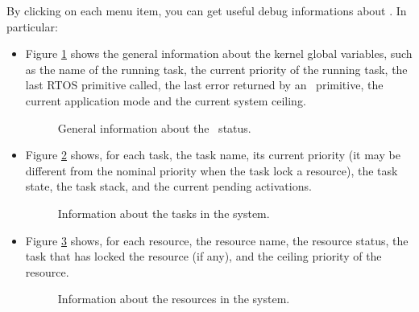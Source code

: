 By clicking on each menu item, you can get useful debug informations
about \ee. In particular:
\begin{itemize}
\item Figure \ref{fig:trace32_os} shows the general information about
  the kernel global variables, such as the name of the running task,
  the current priority of the running task, the last RTOS primitive
  called, the last error returned by an \ee\ primitive, the current
  application mode and the current system ceiling.
%
\begin{figure}
\caption{\label{fig:trace32_os} General information about the \ee\ status.}
\end{figure}
%

\item Figure \ref{fig:trace32_task} shows, for each task, the task
  name, its current priority (it may be different from the nominal
  priority when the task lock a resource), the task state, the task
  stack, and the current pending activations.
%
\begin{figure}
\caption{\label{fig:trace32_task} Information about the tasks in the
system.}
\end{figure}
%

\item Figure \ref{fig:trace32_resource} shows, for each resource, the
  resource name, the resource status, the task that has locked the
  resource (if any), and the ceiling priority of the resource.
%
\begin{figure}
\caption{\label{fig:trace32_resource} Information about the resources
in the system.}
\end{figure}
%


\end{itemize}
